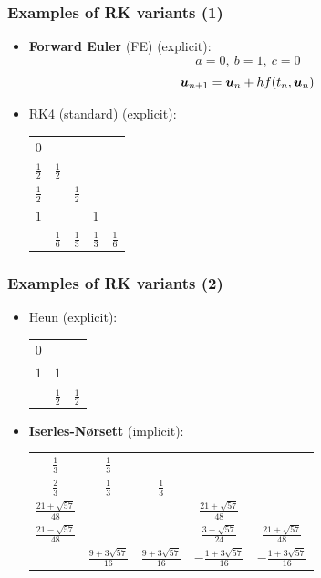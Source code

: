\documentclass{beamer}
\begin{document}
\begin{frame} %
	\frametitle{Examples of RK variants (1)}
	\begin{itemize}
		\item \textbf{Forward Euler} (FE) (explicit):
		$$ a = 0, \ b = 1, \ c = 0 $$
		$$ \boldsymbol u_{n+1} = \boldsymbol u_{n} + h f(t_n, \boldsymbol u_n) $$
		\item RK4 (standard) (explicit): \\
		\begin{center}
			\begin{tabular}{c|cccc}
				$0$ & & & & \\
				$\frac 1 2$ & $\frac 1 2$ & & & \\
				$\frac 1 2$ & & $\frac 1 2$ & & \\
				$1$ & & & 1 & \\
				\hline
				& $\frac 1 6$ & $\frac 1 3$ & $\frac 1 3$ & $\frac 1 6$
				\end{tabular}
		\end{center}	
	\end{itemize}
\end{frame}


\begin{frame} %
	\frametitle{Examples of RK variants (2)}
	\begin{itemize}
		\item Heun (explicit):
		\begin{center}
			\begin{tabular}{c|cc}
				$0$ &     & \\
				$1$ & $1$ & \\
				\hline
				& $\frac 1 2$ & $\frac 1 2$
			\end{tabular}
		\end{center}
		\item \textbf{Iserles-Nørsett} (implicit):
		\begin{center}
			\begin{tabular}{c|cccc}
				$\frac{1}{3}$ & $\frac{1}{3}$ & & & \\
				$\frac{2}{3}$ & $\frac{1}{3}$ & $\frac{1}{3}$ & & \\
				$\frac{21+\sqrt{57}}{48}$ & & & $\frac{21+\sqrt{57}}{48}$ & \\
				$\frac{21-\sqrt{57}}{48}$ & & & $\frac{3-\sqrt{57}}{24}$ & $\frac{21+\sqrt{57}}{48}$ \\
				\hline
				& $\frac{9+3\sqrt{57}}{16}$ & $\frac{9+3\sqrt{57}}{16}$ & $-\frac{1+3\sqrt{57}}{16}$ & $-\frac{1+3\sqrt{57}}{16}$
				\end{tabular}
		\end{center}
	\end{itemize}
\end{frame}
\end{document}
